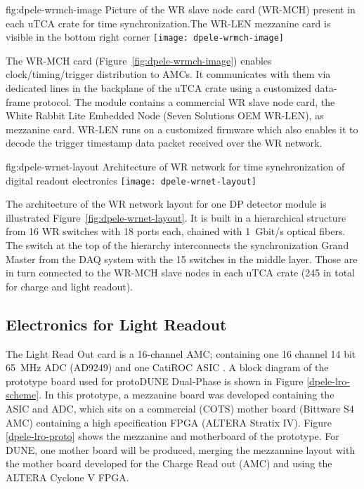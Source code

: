 \begin{dunefigure}{fig:dpele-wrmch-image}
{Picture of the WR slave node card (WR-MCH) present in each uTCA crate for time synchronization.The WR-LEN mezzanine card is visible in the bottom right corner}
\texttt{[image: dpele-wrmch-image]}
\end{dunefigure}

The WR-MCH card (Figure~\ref{fig:dpele-wrmch-image}) enables clock/timing/trigger distribution to AMCs. It communicates with them via dedicated lines in the backplane of the uTCA crate using a customized data-frame protocol. The module contains a commercial WR slave node card, the White Rabbit Lite Embedded Node (Seven Solutions OEM WR-LEN), as mezzanine card. WR-LEN runs on a customized firmware which also enables it to decode the trigger timestamp data packet received over the WR network.

\begin{dunefigure}{fig:dpele-wrnet-layout}
{Architecture of WR network for time synchronization of digital readout electronics}
\texttt{[image: dpele-wrnet-layout]}
\end{dunefigure}

The architecture of the WR network layout for one DP detector module is illustrated Figure~\ref{fig:dpele-wrnet-layout}. It is built in a hierarchical structure from \num{16} WR switches with \num{18} ports each,  chained with \SI{1}{Gbit/s} optical fibers. The switch at the top of the hierarchy interconnects the synchronization Grand Master from the DAQ system with the \num{15} switches in the middle layer. Those are in turn connected to the WR-MCH slave nodes in each uTCA crate (245 in total for charge and light readout). 


\subsection{Electronics for Light Readout}
\label{sec:fddp-tpc-elec-design-lro}

%
The Light Read Out card is a 16-channel AMC; containing one \num{16} channel \num{14} bit \SI{65}{\MHz} ADC (AD9249) and one CatiROC ASIC \cite{catiroc}. A block diagram of the prototype board used for protoDUNE Dual-Phase is shown in Figure \ref{dpele-lro-scheme}. In this prototype, a mezzanine board was developed containing the ASIC and ADC, which sits on a commercial (COTS) mother board (Bittware S4 AMC) containing a high specification FPGA (ALTERA Stratix IV). Figure \ref{dpele-lro-proto} shows the mezzanine and motherboard of the prototype.   For DUNE, one mother board will be produced, merging the mezzannine layout with the mother board developed for the Charge Read out (AMC) and using the ALTERA Cyclone V FPGA. 

